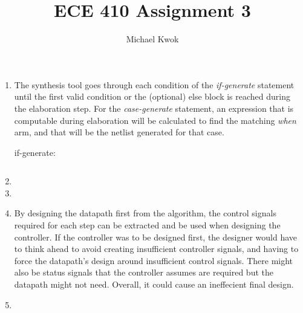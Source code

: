 \documentclass{article}
\title{ECE 410 Assignment 3}
\author{Michael Kwok}
\begin{document}
\maketitle
\begin{enumerate}
    \item The synthesis tool goes through each condition of the \textit{if-generate} statement until the first valid condition or the (optional) else block is reached during the elaboration step. For the \textit{case-generate} statement, an expression that is computable during elaboration will be calculated to find the matching \textit{when} arm, and that will be the netlist generated for that case.

          if-generate:
          \begin{verbatim}

  \end{verbatim}

    \item

    \item

    \item By designing the datapath first from the algorithm, the control signals required for each step can be extracted and be used when designing the controller. If the controller was to be designed first, the designer would have to think ahead to avoid creating insufficient controller signals, and having to force the datapath's design around insufficient control signals. There might also be status signals that the controller assumes are required but the datapath might not need. Overall, it could cause an ineffecient final design.

    \item


\end{enumerate}
\end{document}
